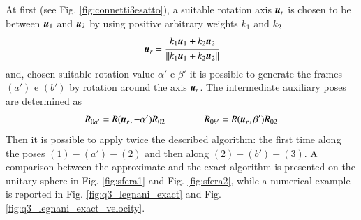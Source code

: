 At first (see Fig. \ref{fig:connetti3esatto}), a suitable rotation axis ${\boldsymbol{u}}_r$ is chosen to be between ${\boldsymbol{u}}_1$ and ${\boldsymbol{u}}_2$ by using positive arbitrary weights $k_1$ and $k_2$
\begin{equation}
    {\boldsymbol{u}}_r= \cfrac{k_1 {\boldsymbol{u}}_1 + k_2 {\boldsymbol{u}}_2}{\left\lVert k_1 {\boldsymbol{u}}_1 + k_2 {\boldsymbol{u}}_2\right\rVert}
    \label{eq:Ur}
\end{equation}
and, chosen suitable rotation value  $\alpha'$ e $\beta'$ it is possible to generate the frames $(a')$ e $(b')$ by rotation around the axis ${\boldsymbol{u}}_r$. The intermediate auxiliary poses are determined as
\begin{equation}
    R_{0a'}=R({\boldsymbol{u}}_r,-\alpha')R_{02} 
    \qquad\qquad   
    R_{0b'}=R({\boldsymbol{u}}_r,\beta')R_{02}
    \label{eq:auxiliary}
\end{equation}
Then it is possible to apply twice the described algorithm: the first time along the poses $(1)-(a')-(2)$ and then along $(2)-(b')-(3)$. A comparison between the approximate and the exact algorithm is presented on the unitary sphere in Fig. \ref{fig:sfera1} and Fig. \ref{fig:sfera2}, while a numerical example is reported in Fig. \ref{fig:q3_legnani_exact} and Fig. \ref{fig:q3_legnani_exact_velocity}.


